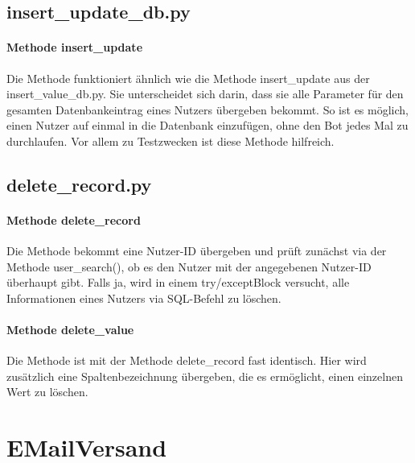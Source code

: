         \subsection{insert\_update\_db.py}
            \paragraph{Methode insert\_update}
                Die Methode funktioniert ähnlich wie die Methode insert\_update aus der insert\_value\_db.py. Sie unterscheidet sich darin, dass sie alle Parameter für den gesamten Datenbankeintrag eines Nutzers übergeben bekommt. So ist es möglich, einen Nutzer auf einmal in die Datenbank einzufügen, ohne den Bot jedes Mal zu durchlaufen. Vor allem zu Testzwecken ist diese Methode hilfreich.
        
        \subsection{delete\_record.py}
            \paragraph{Methode delete\_record}
                Die Methode bekommt eine Nutzer-ID übergeben und prüft zunächst via der Methode user\_search(), ob es den Nutzer mit der angegebenen Nutzer-ID überhaupt gibt. Falls ja, wird in einem try/except\-Block versucht, alle Informationen eines Nutzers via SQL-Befehl zu löschen. 


            \paragraph{Methode delete\_value}
                Die Methode ist mit der Methode delete\_record fast identisch. Hier wird zusätzlich eine Spaltenbezeichnung übergeben, die es ermöglicht, einen einzelnen Wert zu löschen.



    \section{E\-Mail\-Versand}



    
    
    \section{}
    
